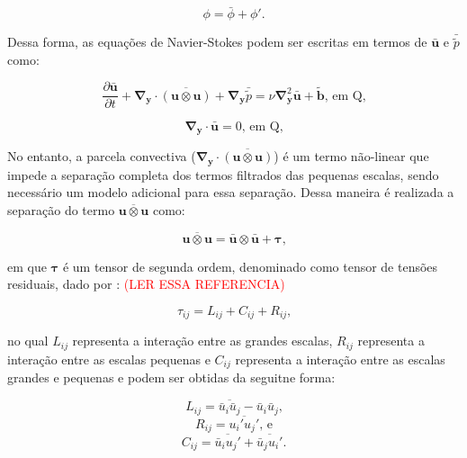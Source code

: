 \documentclass[_ArquivoPrincipal.tex]{subfiles}
\begin{document}
\begin{equation}
    \phi=\bar{\phi}+\phi'\text{.}
    \label{Sep}
\end{equation}

Dessa forma, as equações de Navier-Stokes podem ser escritas em termos de $\bar{\mathbf{u}}$ e $\bar{\tilde{p}}$ como:

\begin{equation}
    \frac{\partial\bar{\mathbf{u}}}{\partial t}+\mathbf{\nabla}_\mathbf{y}\cdot\overline{(\mathbf{u}\otimes\mathbf{u})}+\mathbf{\nabla}_\mathbf{y}\bar{\tilde{p}}=\nu\mathbf{\nabla}^2_\mathbf{y}\bar{\mathbf{u}}+\tilde{\mathbf{b}}\text{, em }\mathrm{Q}\text{,}
    \label{SistFilt1}
\end{equation}

\begin{equation}
    \mathbf{\nabla}_\mathbf{y}\cdot\bar{\mathbf{u}}=0\text{, em }\mathrm{Q}\text{,}
    \label{SistFilt2}
\end{equation}

No entanto, a parcela convectiva ($\mathbf{\nabla}_\mathbf{y}\cdot\overline{(\mathbf{u}\otimes\mathbf{u})}$) é um termo não-linear que impede a separação completa dos termos filtrados das pequenas escalas, sendo necessário um modelo adicional para essa separação. Dessa maneira é realizada a separação do termo $\overline{\mathbf{u}\otimes\mathbf{u}}$ como:

\begin{equation}
    \overline{\mathbf{u}\otimes\mathbf{u}}=\bar{\mathbf{u}}\otimes\bar{\mathbf{u}}+\mathbf{\tau}\text{,}
    \label{Sep2}
\end{equation}

\noindent em que $\mathbf{\tau}$ é um tensor de segunda ordem, denominado como tensor de tensões residuais, dado por \cite{leonard1975energy}: \textcolor{red}{(LER ESSA REFERENCIA)}

\begin{equation}
    \tau_{ij}=L_{ij}+C_{ij}+R_{ij}\text{,}
    \label{TensRes}
\end{equation}

\noindent no qual $L_{ij}$ representa a interação entre as grandes escalas, $R_{ij}$ representa a interação entre as escalas pequenas e $C_{ij}$ representa a interação entre as escalas grandes e pequenas e podem ser obtidas da seguitne forma:

\begin{equation}
    L_{ij}=\overline{\bar{u}_i\bar{u}_j}-\bar{u}_i\bar{u}_j\text{,}
    \label{Lij}
\end{equation}
\begin{equation}
    R_{ij}=\overline{u_i'u_j'}\text{, e}
    \label{Cij}
\end{equation}
\begin{equation}
    C_{ij}=\overline{\bar{u}_iu_j'}+\overline{\bar{u}_ju_i'}\text{.}
    \label{Rij}
\end{equation}
\end{document}
